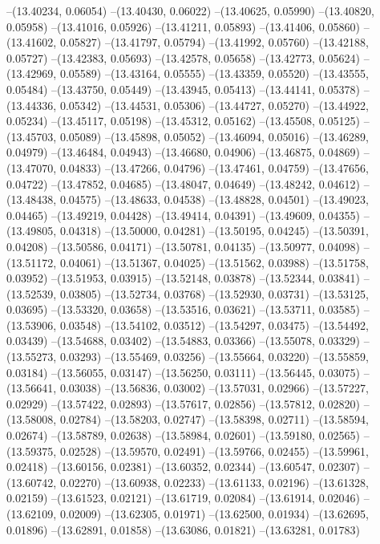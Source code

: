 --(13.40234, 0.06054)
--(13.40430, 0.06022)
--(13.40625, 0.05990)
--(13.40820, 0.05958)
--(13.41016, 0.05926)
--(13.41211, 0.05893)
--(13.41406, 0.05860)
--(13.41602, 0.05827)
--(13.41797, 0.05794)
--(13.41992, 0.05760)
--(13.42188, 0.05727)
--(13.42383, 0.05693)
--(13.42578, 0.05658)
--(13.42773, 0.05624)
--(13.42969, 0.05589)
--(13.43164, 0.05555)
--(13.43359, 0.05520)
--(13.43555, 0.05484)
--(13.43750, 0.05449)
--(13.43945, 0.05413)
--(13.44141, 0.05378)
--(13.44336, 0.05342)
--(13.44531, 0.05306)
--(13.44727, 0.05270)
--(13.44922, 0.05234)
--(13.45117, 0.05198)
--(13.45312, 0.05162)
--(13.45508, 0.05125)
--(13.45703, 0.05089)
--(13.45898, 0.05052)
--(13.46094, 0.05016)
--(13.46289, 0.04979)
--(13.46484, 0.04943)
--(13.46680, 0.04906)
--(13.46875, 0.04869)
--(13.47070, 0.04833)
--(13.47266, 0.04796)
--(13.47461, 0.04759)
--(13.47656, 0.04722)
--(13.47852, 0.04685)
--(13.48047, 0.04649)
--(13.48242, 0.04612)
--(13.48438, 0.04575)
--(13.48633, 0.04538)
--(13.48828, 0.04501)
--(13.49023, 0.04465)
--(13.49219, 0.04428)
--(13.49414, 0.04391)
--(13.49609, 0.04355)
--(13.49805, 0.04318)
--(13.50000, 0.04281)
--(13.50195, 0.04245)
--(13.50391, 0.04208)
--(13.50586, 0.04171)
--(13.50781, 0.04135)
--(13.50977, 0.04098)
--(13.51172, 0.04061)
--(13.51367, 0.04025)
--(13.51562, 0.03988)
--(13.51758, 0.03952)
--(13.51953, 0.03915)
--(13.52148, 0.03878)
--(13.52344, 0.03841)
--(13.52539, 0.03805)
--(13.52734, 0.03768)
--(13.52930, 0.03731)
--(13.53125, 0.03695)
--(13.53320, 0.03658)
--(13.53516, 0.03621)
--(13.53711, 0.03585)
--(13.53906, 0.03548)
--(13.54102, 0.03512)
--(13.54297, 0.03475)
--(13.54492, 0.03439)
--(13.54688, 0.03402)
--(13.54883, 0.03366)
--(13.55078, 0.03329)
--(13.55273, 0.03293)
--(13.55469, 0.03256)
--(13.55664, 0.03220)
--(13.55859, 0.03184)
--(13.56055, 0.03147)
--(13.56250, 0.03111)
--(13.56445, 0.03075)
--(13.56641, 0.03038)
--(13.56836, 0.03002)
--(13.57031, 0.02966)
--(13.57227, 0.02929)
--(13.57422, 0.02893)
--(13.57617, 0.02856)
--(13.57812, 0.02820)
--(13.58008, 0.02784)
--(13.58203, 0.02747)
--(13.58398, 0.02711)
--(13.58594, 0.02674)
--(13.58789, 0.02638)
--(13.58984, 0.02601)
--(13.59180, 0.02565)
--(13.59375, 0.02528)
--(13.59570, 0.02491)
--(13.59766, 0.02455)
--(13.59961, 0.02418)
--(13.60156, 0.02381)
--(13.60352, 0.02344)
--(13.60547, 0.02307)
--(13.60742, 0.02270)
--(13.60938, 0.02233)
--(13.61133, 0.02196)
--(13.61328, 0.02159)
--(13.61523, 0.02121)
--(13.61719, 0.02084)
--(13.61914, 0.02046)
--(13.62109, 0.02009)
--(13.62305, 0.01971)
--(13.62500, 0.01934)
--(13.62695, 0.01896)
--(13.62891, 0.01858)
--(13.63086, 0.01821)
--(13.63281, 0.01783)
